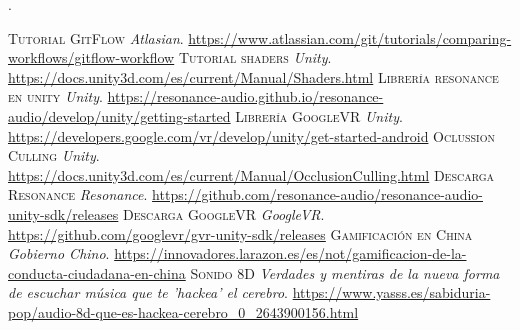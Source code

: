 	
	
	
	\thispagestyle{empty} 
	\textcolor[rgb]{1.00,1.00,1.00}{.} 
	\newpage %
	
	
	\begin{thebibliography}{99}
			\textsc{Tutorial GitFlow}
			\textit{Atlasian}.
			\newline
			\url{https://www.atlassian.com/git/tutorials/comparing-workflows/gitflow-workflow}
			\textsc{Tutorial shaders}
			\textit{Unity}.
			\newline
			\url{https://docs.unity3d.com/es/current/Manual/Shaders.html}
			\textsc{Librería resonance en unity}
			\textit{Unity}.
			\newline
			\url{https://resonance-audio.github.io/resonance-audio/develop/unity/getting-started}
			\textsc{Librería GoogleVR}
			\textit{Unity}.
			\newline
			\url{https://developers.google.com/vr/develop/unity/get-started-android}
			\textsc{Oclussion Culling}
			\textit{Unity}.
			\newline
			\url{https://docs.unity3d.com/es/current/Manual/OcclusionCulling.html}
			\textsc{Descarga Resonance}
			\textit{Resonance}.
			\newline
			\url{https://github.com/resonance-audio/resonance-audio-unity-sdk/releases}
			\textsc{Descarga GoogleVR}
			\textit{GoogleVR}.
			\newline
			\url{https://github.com/googlevr/gvr-unity-sdk/releases}
			\textsc{Gamificación en China}
			\textit{Gobierno Chino}.
			\newline
			\url{https://innovadores.larazon.es/es/not/gamificacion-de-la-conducta-ciudadana-en-china}	
			\textsc{Sonido 8D}
			\textit{Verdades y mentiras de la nueva forma de escuchar música que te 'hackea' el cerebro}.
			\newline
			\url{https://www.yasss.es/sabiduria-pop/audio-8d-que-es-hackea-cerebro_0_2643900156.html}

\end{thebibliography}
